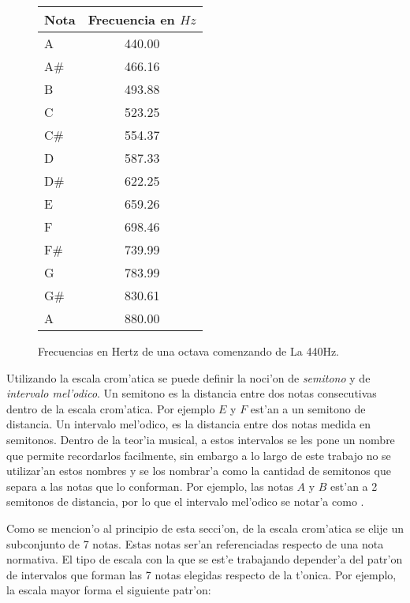 \begin{figure}
\begin{center}
    \begin{tabular}[c]{|l|c|}
    \hline
    \textbf{Nota} & \textbf{Frecuencia en $Hz$} \\
    \hline 
    A		&	440.00 \\
    A\#		&	466.16 \\
    B		&	493.88 \\
    C		&	523.25 \\
    C\#		&	554.37 \\
    D		&	587.33 \\
    D\#		&	622.25 \\
    E		&	659.26 \\
    F		&	698.46 \\
    F\#		&	739.99 \\
    G		&	783.99 \\
    G\#		&	830.61 \\
    A		&	880.00 \\ 
    \hline
    \end{tabular}
 \caption{Frecuencias en Hertz de una octava comenzando de La 440Hz.}
 \label{tab:cromatica}
\end{center}
\end{figure}


Utilizando la escala crom'atica se puede definir la noci'on de \emph{semitono} y de \emph{intervalo mel'odico}. Un semitono es la distancia
entre dos notas consecutivas dentro de la escala crom'atica. Por ejemplo $E$ y $F$ est'an a un semitono de distancia. Un intervalo mel'odico, 
es la distancia entre dos notas medida en semitonos. Dentro de la teor'ia musical, a estos intervalos se les pone un nombre que permite recordarlos 
facilmente, sin embargo a lo largo de este trabajo no se utilizar'an estos nombres y se los nombrar'a como la cantidad de semitonos que separa
a las notas que lo conforman. Por ejemplo, las notas $A$ y $B$ est'an a 2 semitonos de distancia, por lo que el intervalo mel'odico
se notar'a como . 

Como se mencion'o al principio de esta secci'on, de la escala crom'atica se elije un subconjunto de 7 notas. Estas notas ser'an referenciadas
respecto de una nota normativa. El tipo de escala con la que se est'e trabajando depender'a del patr'on de intervalos que forman las 7 notas elegidas
respecto de la t'onica. Por ejemplo, la escala mayor forma el siguiente patr'on:

\begin{center}
      
\end{center}

